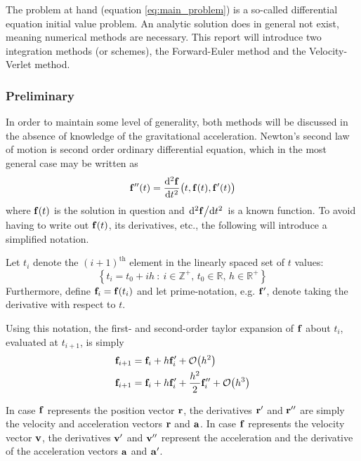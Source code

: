\documentclass[reprint,english]{revtex4-1}
\begin{document}
The problem at hand (equation \eqref{eq:main_problem}) is a so-called differential equation initial value problem. An analytic solution does in general not exist, meaning numerical methods are necessary. This report will introduce two integration methods (or schemes), the Forward-Euler method and the Velocity-Verlet method.
\subsubsection{Preliminary}
In order to maintain some level of generality, both methods will be discussed in the absence of knowledge of the gravitational acceleration. Newton's second law of motion is second order ordinary differential equation, which in the most general case may be written as
\begin{equation}\label{eq:second_order_diff_eq}
\vb{f}''(t)=\dv[2]{\vb{f}}{t}\big(t,\vb{f}(t),\vb{f}'(t)\big)
\end{equation}
where \(\vb{f}(t)\) is the solution in question and \(\dv*[2]{\vb{f}}{t}\) is a known function. To avoid having to write out \(\vb{f}(t)\), its derivatives, etc., the following will introduce a simplified notation.

Let \(t_i\) denote the \((i+1)^\text{th}\) element in the linearly spaced set of \(t\) values:
\begin{equation}
\left\{t_i=t_0+ih\ :\ i\in\mathbb{Z}^+,\,t_0\in\mathbb{R},\,h\in\mathbb{R}^+\right\}
\end{equation}
Furthermore, define \(\vb{f}_i=\vb{f}(t_i)\) and let prime-notation, e.g. \(\vb{f}'\), denote taking the derivative with respect to \(t\).

Using this notation, the first- and second-order taylor expansion of \(\vb{f}\) about \(t_i\), evaluated at \(t_{i+1}\), is simply
\begin{subequations}\label{eq:general_taylor_expansion}
\begin{align}
\vb{f}_{i+1}&=\vb{f}_i+h\vb{f}'_i+\order{h^2}\\
\vb{f}_{i+1}&=\vb{f}_i+h\vb{f}'_i+\frac{h^2}{2}\vb{f}''_i+\order{h^3}
\end{align}
\end{subequations}

In case \(\vb{f}\) represents the position vector \(\vb{r}\), the derivatives \(\vb{r}'\) and \(\vb{r}''\) are simply the velocity and acceleration vectors \(\vb{r}\) and \(\vb{a}\). In case \(\vb{f}\) represents the velocity vector \(\vb{v}\), the derivatives \(\vb{v}'\) and \(\vb{v}''\) represent the acceleration and the derivative of the acceleration vectors \(\vb{a}\) and \(\vb{a}'\).
\end{document}
